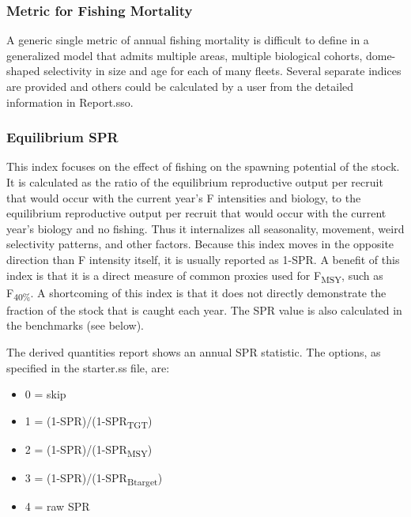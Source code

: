 \subsubsection{Metric for Fishing Mortality}
A generic single metric of annual fishing mortality is difficult to define in a generalized model that admits multiple areas, multiple biological cohorts, dome-shaped selectivity in size and age for each of many fleets. Several separate indices are provided and others could be calculated by a user from the detailed information in Report.sso.

\subsubsection{Equilibrium SPR}
This index focuses on the effect of fishing on the spawning potential of the stock. It is calculated as the ratio of the equilibrium reproductive output per recruit that would occur with the current year's F intensities and biology, to the equilibrium reproductive output per recruit that would occur with the current year's biology and no fishing.  Thus it internalizes all seasonality, movement, weird selectivity patterns, and other factors. Because this index moves in the opposite direction than F intensity itself, it is usually reported as 1-SPR. A benefit of this index is that it is a direct measure of common proxies used for F\textsubscript{MSY}, such as F\textsubscript {40\%}. A shortcoming of this index is that it does not directly demonstrate the fraction of the stock that is caught each year. The SPR value is also calculated in the benchmarks (see below). 

The derived quantities report shows an annual SPR statistic.  The options, as specified in the starter.ss file, are:
\begin{itemize}
	\item 0 = skip
	\item 1 = (1-SPR)/(1-SPR\textsubscript{TGT})
	\item 2 = (1-SPR)/(1-SPR\textsubscript{MSY})
	\item 3 = (1-SPR)/(1-SPR\textsubscript{Btarget})
	\item 4 = raw SPR
\end{itemize}

